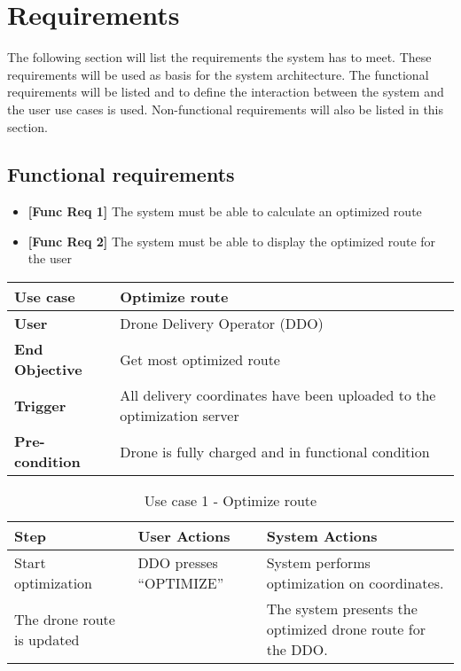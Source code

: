 
\chapter{Requirements}

The following section will list the requirements the system has to meet. These requirements will be used as basis for the system architecture. The functional requirements will be listed and to define the interaction between the system and the user use cases is used. Non-functional requirements will also be listed in this section. 

\section{Functional requirements}
\begin{itemize}
	\item \textbf{[Func Req 1]} The system must be able to calculate an optimized route
	\item \textbf{[Func Req 2]} The system must be able to display the optimized route for the user
\end{itemize}

\begin{table}[H]
	\begin{tabular}{|l|l|}
		\hline
		\cellcolor[HTML]{EFEFEF} \textbf{Use case}  & \cellcolor[HTML]{EFEFEF} \textbf{Optimize route}\\ \hline
		\cellcolor[HTML]{EFEFEF} \textbf{User} &  Drone Delivery Operator (DDO) \\ \hline
		\cellcolor[HTML]{EFEFEF} \textbf{End Objective} &  Get most optimized route\\ \hline
		\cellcolor[HTML]{EFEFEF} \textbf{Trigger} & All delivery coordinates have been uploaded to the optimization server \\ \hline 
		\cellcolor[HTML]{EFEFEF} \textbf{Pre-condition} & Drone is fully charged and in functional condition \\ \hline
	\end{tabular}
\end{table}


\begin{table}[H]
	\centering
	
	\label{Use_case_1_optimize_route}
	
	\begin{tabular}{|p{2cm}|p{5cm}|p{5cm}|}
		\hline
		\cellcolor[HTML]{EFEFEF} \textbf{Step} & \cellcolor[HTML]{EFEFEF} \textbf{User Actions}  & \cellcolor[HTML]{EFEFEF} \textbf{System Actions} \\ \hline
		\cellcolor[HTML]{EFEFEF} Start optimization &  DDO presses “OPTIMIZE”  & System performs optimization on coordinates. \\ \hline
		\cellcolor[HTML]{EFEFEF} The drone route is updated   &     &  The system presents the optimized drone route for the DDO.  \\ \hline
		
	\end{tabular}
	\caption{Use case 1 - Optimize route}
\end{table}


